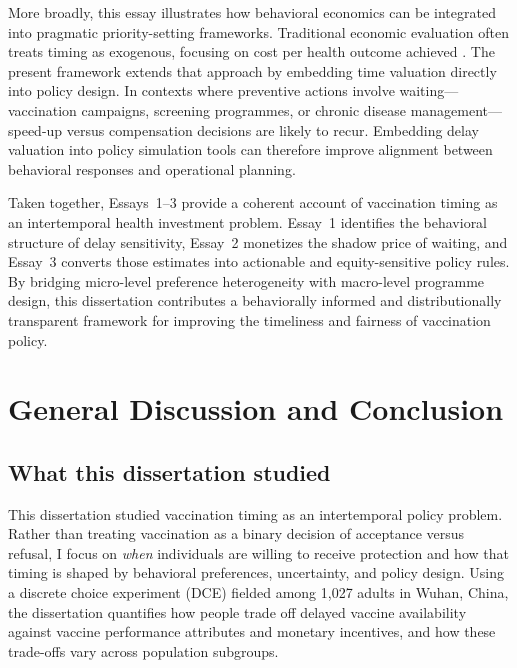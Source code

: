 \documentclass[doublespacing]{utdthesis}
\let\cite=\citep
\begin{document}
More broadly, this essay illustrates how behavioral economics can be integrated into pragmatic priority-setting frameworks. Traditional economic evaluation often treats timing as exogenous, focusing on cost per health outcome achieved \cite{Drummond2015}. The present framework extends that approach by embedding time valuation directly into policy design. In contexts where preventive actions involve waiting—vaccination campaigns, screening programmes, or chronic disease management—speed-up versus compensation decisions are likely to recur. Embedding delay valuation into policy simulation tools can therefore improve alignment between behavioral responses and operational planning.

Taken together, Essays~1--3 provide a coherent account of vaccination timing as an intertemporal health investment problem. Essay~1 identifies the behavioral structure of delay sensitivity, Essay~2 monetizes the shadow price of waiting, and Essay~3 converts those estimates into actionable and equity-sensitive policy rules. By bridging micro-level preference heterogeneity with macro-level programme design, this dissertation contributes a behaviorally informed and distributionally transparent framework for improving the timeliness and fairness of vaccination policy.

\clearpage

\chapter{General Discussion and Conclusion}
\label{ch:conclusion}

\section{What this dissertation studied}
\label{sec:dissertation_overview_studied}

This dissertation studied vaccination timing as an intertemporal policy problem. Rather than treating vaccination as a binary decision of acceptance versus refusal, I focus on \emph{when} individuals are willing to receive protection and how that timing is shaped by behavioral preferences, uncertainty, and policy design. Using a discrete choice experiment (DCE) fielded among 1,027 adults in Wuhan, China, the dissertation quantifies how people trade off delayed vaccine availability against vaccine performance attributes and monetary incentives, and how these trade-offs vary across population subgroups.
\end{document}
